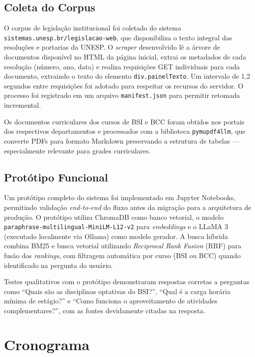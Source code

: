 \documentclass[
  12pt,
  openright,
  twoside,
  a4paper,
  brazil
]{abntex2}
\begin{document}
\section{Coleta do Corpus}

O corpus de legislação institucional foi coletado do sistema \texttt{sistemas.unesp.br/legislacao-web}, que disponibiliza o texto integral das resoluções e portarias da UNESP. O \textit{scraper} desenvolvido lê a árvore de documentos disponível no HTML da página inicial, extrai os metadados de cada resolução (número, ano, data) e realiza requisições GET individuais para cada documento, extraindo o texto do elemento \texttt{div.painelTexto}. Um intervalo de 1,2 segundos entre requisições foi adotado para respeitar os recursos do servidor. O processo foi registrado em um arquivo \texttt{manifest.json} para permitir retomada incremental.

Os documentos curriculares dos cursos de BSI e BCC foram obtidos nos portais dos respectivos departamentos e processados com a biblioteca \texttt{pymupdf4llm}, que converte PDFs para formato Markdown preservando a estrutura de tabelas --- especialmente relevante para grades curriculares.

\section{Protótipo Funcional}

Um protótipo completo do sistema foi implementado em Jupyter Notebooks, permitindo validação \textit{end-to-end} do fluxo antes da migração para a arquitetura de produção. O protótipo utiliza ChromaDB como banco vetorial, o modelo \texttt{paraphrase-multilingual-MiniLM-L12-v2} para \textit{embeddings} e o LLaMA 3 (executado localmente via Ollama) como modelo gerador. A busca híbrida combina BM25 e busca vetorial utilizando \textit{Reciprocal Rank Fusion} (RRF) para fusão dos \textit{rankings}, com filtragem automática por curso (BSI ou BCC) quando identificado na pergunta do usuário.

Testes qualitativos com o protótipo demonstraram respostas corretas a perguntas como ``Quais são as disciplinas optativas do BSI?'', ``Qual é a carga horária mínima de estágio?'' e ``Como funciona o aproveitamento de atividades complementares?'', com as fontes devidamente citadas na resposta.

\chapter*{Cronograma}
\end{document}
